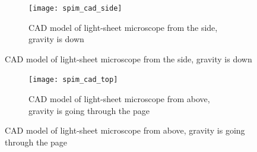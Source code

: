 %
\clearpage
\begin{figure}
    \centering
    \begin{subfigure}[b]{\textwidth}
        \centering
        \texttt{[image: spim\_cad\_side]}
        \caption{\gls{CAD} model of \gls{light-sheet} microscope from the side, gravity is down}\label{fig:solidworks_design_front}
    \end{subfigure}
\end{figure}
\clearpage
\begin{figure}
    \ContinuedFloat{}
    \begin{subfigure}[b]{\textwidth}
        \centering
        \texttt{[image: spim\_cad\_top]}
        \caption[\gls{CAD} model of \gls{light-sheet} microscope from above]{\gls{CAD} model of \gls{light-sheet} microscope from above, gravity is going through the page}\label{fig:soldiworks_top}
    \end{subfigure}   %
\end{figure}
